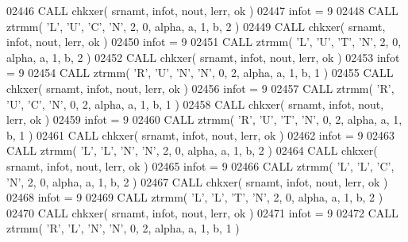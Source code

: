 \begin{DoxyCode}
02446       \textcolor{keyword}{CALL }chkxer( srnamt, infot, nout, lerr, ok )
02447       infot = 9
02448       \textcolor{keyword}{CALL }ztrmm( \textcolor{stringliteral}{'L'}, \textcolor{stringliteral}{'U'}, \textcolor{stringliteral}{'C'}, \textcolor{stringliteral}{'N'}, 2, 0, alpha, a, 1, b, 2 )
02449       \textcolor{keyword}{CALL }chkxer( srnamt, infot, nout, lerr, ok )
02450       infot = 9
02451       \textcolor{keyword}{CALL }ztrmm( \textcolor{stringliteral}{'L'}, \textcolor{stringliteral}{'U'}, \textcolor{stringliteral}{'T'}, \textcolor{stringliteral}{'N'}, 2, 0, alpha, a, 1, b, 2 )
02452       \textcolor{keyword}{CALL }chkxer( srnamt, infot, nout, lerr, ok )
02453       infot = 9
02454       \textcolor{keyword}{CALL }ztrmm( \textcolor{stringliteral}{'R'}, \textcolor{stringliteral}{'U'}, \textcolor{stringliteral}{'N'}, \textcolor{stringliteral}{'N'}, 0, 2, alpha, a, 1, b, 1 )
02455       \textcolor{keyword}{CALL }chkxer( srnamt, infot, nout, lerr, ok )
02456       infot = 9
02457       \textcolor{keyword}{CALL }ztrmm( \textcolor{stringliteral}{'R'}, \textcolor{stringliteral}{'U'}, \textcolor{stringliteral}{'C'}, \textcolor{stringliteral}{'N'}, 0, 2, alpha, a, 1, b, 1 )
02458       \textcolor{keyword}{CALL }chkxer( srnamt, infot, nout, lerr, ok )
02459       infot = 9
02460       \textcolor{keyword}{CALL }ztrmm( \textcolor{stringliteral}{'R'}, \textcolor{stringliteral}{'U'}, \textcolor{stringliteral}{'T'}, \textcolor{stringliteral}{'N'}, 0, 2, alpha, a, 1, b, 1 )
02461       \textcolor{keyword}{CALL }chkxer( srnamt, infot, nout, lerr, ok )
02462       infot = 9
02463       \textcolor{keyword}{CALL }ztrmm( \textcolor{stringliteral}{'L'}, \textcolor{stringliteral}{'L'}, \textcolor{stringliteral}{'N'}, \textcolor{stringliteral}{'N'}, 2, 0, alpha, a, 1, b, 2 )
02464       \textcolor{keyword}{CALL }chkxer( srnamt, infot, nout, lerr, ok )
02465       infot = 9
02466       \textcolor{keyword}{CALL }ztrmm( \textcolor{stringliteral}{'L'}, \textcolor{stringliteral}{'L'}, \textcolor{stringliteral}{'C'}, \textcolor{stringliteral}{'N'}, 2, 0, alpha, a, 1, b, 2 )
02467       \textcolor{keyword}{CALL }chkxer( srnamt, infot, nout, lerr, ok )
02468       infot = 9
02469       \textcolor{keyword}{CALL }ztrmm( \textcolor{stringliteral}{'L'}, \textcolor{stringliteral}{'L'}, \textcolor{stringliteral}{'T'}, \textcolor{stringliteral}{'N'}, 2, 0, alpha, a, 1, b, 2 )
02470       \textcolor{keyword}{CALL }chkxer( srnamt, infot, nout, lerr, ok )
02471       infot = 9
02472       \textcolor{keyword}{CALL }ztrmm( \textcolor{stringliteral}{'R'}, \textcolor{stringliteral}{'L'}, \textcolor{stringliteral}{'N'}, \textcolor{stringliteral}{'N'}, 0, 2, alpha, a, 1, b, 1 )

\end{DoxyCode}
